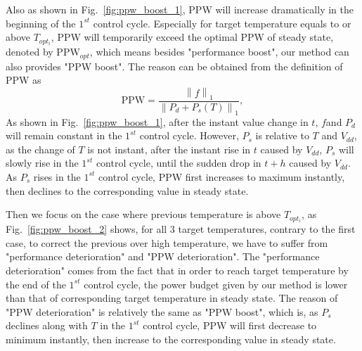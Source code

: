 Also as shown in Fig.~\ref{fig:ppw_boost_1}, PPW will increase dramatically in the beginning of the $1^{st}$ control cycle. Especially for target temperature equals to or above $T_{opt_{i}}$, PPW will temporarily exceed the optimal PPW of steady state, denoted by $\text{PPW}_{opt}$, which means besides "performance boost", our method can also provides "PPW boost". The reason can be obtained from the definition of PPW as
\begin{equation}\label{eq:ppw_detail}
\text{PPW} = \frac{\left \| f \right \|_{1}}{\left \| P_{d}+P_{s}(T) \right \|_{1}},
\end{equation}
As shown in Fig.~\ref{fig:ppw_boost_1}, after the instant value change in $t$, $f$and $P_{d}$ will remain constant in the $1^{st}$ control cycle. However, $P_{s}$ is relative to $T$ and $V_{dd}$, as the change of $T$ is not instant, after the instant rise in $t$ caused by $V_{dd}$, $P_{s}$ will slowly rise in the $1^{st}$ control cycle, until the sudden drop in $t+h$ caused by $V_{dd}$. As $P_{s}$ rises in the $1^{st}$ control cycle, PPW first increases to maximum instantly, then declines to the corresponding value in steady state.






Then we focus on the case where previous temperature is above $T_{opt_{i}}$, as Fig.~\ref{fig:ppw_boost_2} shows, for all $3$ target temperatures, contrary to the first case, to correct the previous over high temperature, we have to suffer from "performance deterioration" and "PPW deterioration". The "performance deterioration" comes from the fact that in order to reach target temperature by the end of the $1^{st}$ control cycle, the power budget given by our method is lower than that of corresponding target temperature in steady state. The reason of "PPW deterioration" is relatively the same as "PPW boost", which is, as $P_{s}$declines along with $T$ in the $1^{st}$ control cycle, PPW will first decrease to minimum instantly, then increase to the corresponding value in steady state.



